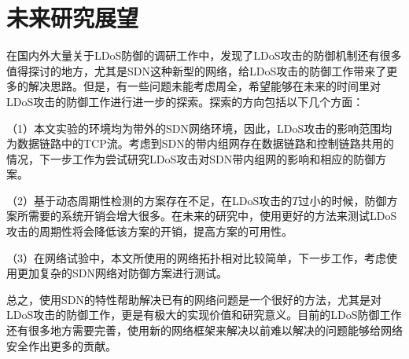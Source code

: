 \section{未来研究展望}
\label{chap6:expection}

在国内外大量关于LDoS防御的调研工作中，发现了LDoS攻击的防御机制还有很多值得探讨的地方，尤其是SDN这种新型的网络，给LDoS攻击的防御工作带来了更多的解决思路。但是，有一些问题未能考虑周全，希望能够在未来的时间里对LDoS攻击的防御工作进行进一步的探索。探索的方向包括以下几个方面：

（1）本文实验的环境均为带外的SDN网络环境，因此，LDoS攻击的影响范围均为数据链路中的TCP流。考虑到SDN的带内组网存在数据链路和控制链路共用的情况，下一步工作为尝试研究LDoS攻击对SDN带内组网的影响和相应的防御方案。

（2）基于动态周期性检测的方案存在不足，在LDoS攻击的$T$过小的时候，防御方案所需要的系统开销会增大很多。在未来的研究中，使用更好的方法来测试LDoS攻击的周期性将会降低该方案的开销，提高方案的可用性。

（3）在网络试验中，本文所使用的网络拓扑相对比较简单，下一步工作，考虑使用更加复杂的SDN网络对防御方案进行测试。

总之，使用SDN的特性帮助解决已有的网络问题是一个很好的方法，尤其是对LDoS攻击的防御工作，更是有极大的实现价值和研究意义。目前的LDoS防御工作还有很多地方需要完善，使用新的网络框架来解决以前难以解决的问题能够给网络安全作出更多的贡献。